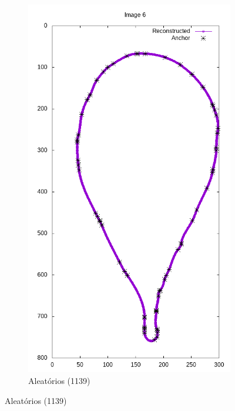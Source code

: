 \begin{frame}
\begin{figure}[ht!]
\begin{subfigure}[t]{0.24\textwidth}
			\includegraphics[width=\textwidth]{img/rec/6rng(1139).png}
			\caption{Aleatórios (1139)}
		\end{subfigure}
		\label{fig:rec6}
	\end{figure}
\end{frame}

